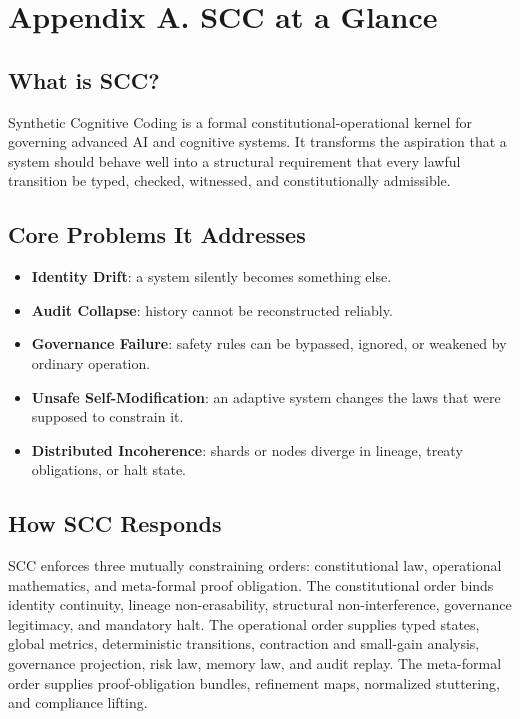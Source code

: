 \documentclass[10pt,oneside]{article}
\theoremstyle{definition}
\theoremstyle{remark}
\begin{document}
\section{Appendix A. SCC at a Glance}
\subsection*{What is SCC?}
Synthetic Cognitive Coding is a formal constitutional-operational kernel for governing advanced AI and cognitive systems. It transforms the aspiration that a system should behave well into a structural requirement that every lawful transition be typed, checked, witnessed, and constitutionally admissible.

\subsection*{Core Problems It Addresses}
\begin{itemize}
  \item \textbf{Identity Drift}: a system silently becomes something else.
  \item \textbf{Audit Collapse}: history cannot be reconstructed reliably.
  \item \textbf{Governance Failure}: safety rules can be bypassed, ignored, or weakened by ordinary operation.
  \item \textbf{Unsafe Self-Modification}: an adaptive system changes the laws that were supposed to constrain it.
  \item \textbf{Distributed Incoherence}: shards or nodes diverge in lineage, treaty obligations, or halt state.
\end{itemize}

\subsection*{How SCC Responds}
SCC enforces three mutually constraining orders: constitutional law, operational mathematics, and meta-formal proof obligation. The constitutional order binds identity continuity, lineage non-erasability, structural non-interference, governance legitimacy, and mandatory halt. The operational order supplies typed states, global metrics, deterministic transitions, contraction and small-gain analysis, governance projection, risk law, memory law, and audit replay. The meta-formal order supplies proof-obligation bundles, refinement maps, normalized stuttering, and compliance lifting.
\end{document}
